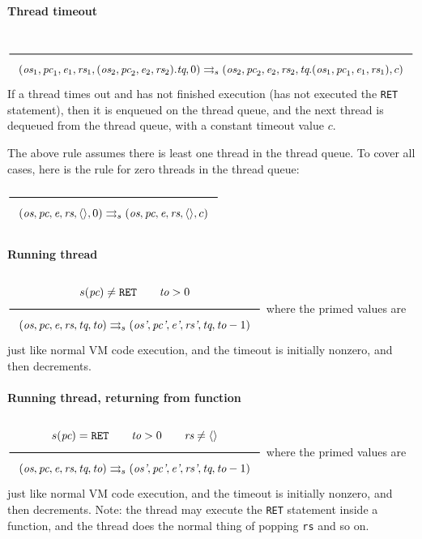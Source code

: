 \paragraph{Thread timeout}
\label{sec:org5744804}
\(\\\Rule{}{(\textit{os}_1, \textit{pc}_1, \textit{e}_1, \textit{rs}_1, (\textit{os}_2, \textit{pc}_2, \textit{e}_2, \textit{rs}_2).\textit{tq}, 0) \transition (\textit{os}_2, \textit{pc}_2, \textit{e}_2, \textit{rs}_2, \textit{tq}.(\textit{os}_1, \textit{pc}_1, \textit{e}_1, \textit{rs}_1), c)}\\\)
If a thread times out and has not finished execution (has not executed the \texttt{RET} statement), then it is enqueued on the thread queue, and the next thread is dequeued from the thread queue, with a constant timeout value \(c\).

The above rule assumes there is least one thread in the thread queue. To cover all cases, here is the rule for zero threads in the thread queue:
\(\\\Rule{}{(\textit{os}, \textit{pc}, \textit{e}, \textit{rs}, \langle \rangle, 0) \transition (\textit{os}, \textit{pc}, \textit{e}, \textit{rs}, \langle \rangle, c)}\\\)

\paragraph{Running thread}
\label{sec:orgfa4cc96}
\(\\\Rule{s(\textit{pc}) \neq \texttt{RET} \qquad \textit{to} > 0}{(\textit{os}, \textit{pc}, \textit{e}, \textit{rs}, \textit{tq}, \textit{to}) \transition (\textit{os'}, \textit{pc'}, \textit{e'}, \textit{rs'}, \textit{tq}, \textit{to}-1)}\\\)
where the primed values are just like normal VM code execution, and the timeout is initially nonzero, and then decrements.

\paragraph{Running thread, returning from function}
\label{sec:orgc0cd6b5}
\(\\\Rule{s(\textit{pc}) = \texttt{RET} \qquad \textit{to} > 0 \qquad \textit{rs} \neq \langle \rangle}{(\textit{os}, \textit{pc}, \textit{e}, \textit{rs}, \textit{tq}, \textit{to}) \transition (\textit{os'}, \textit{pc'}, \textit{e'}, \textit{rs'}, \textit{tq}, \textit{to}-1)}\\\)
where the primed values are just like normal VM code execution, and the timeout is initially nonzero, and then decrements. Note: the thread may execute the \texttt{RET} statement inside a function, and the thread does the normal thing of popping \texttt{rs} and so on.

